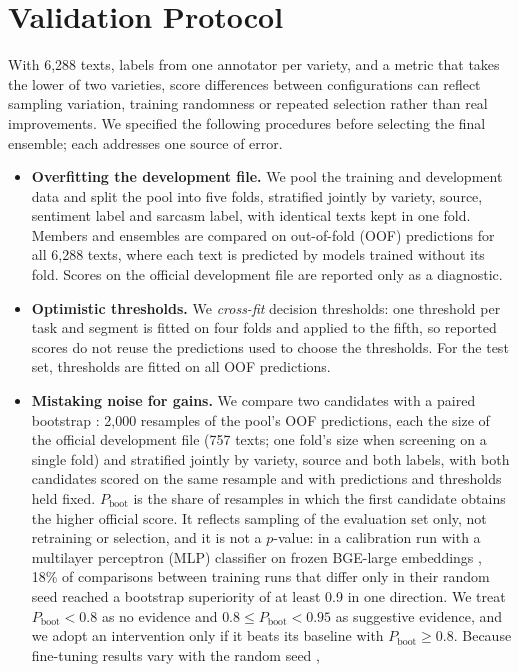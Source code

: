 \documentclass[11pt]{article}
\newcommand{\pboot}{P_{\mathrm{boot}}}
\begin{document}
\section{Validation Protocol}
\label{sec:protocol}
With 6,288 texts, labels from one annotator per variety, and a metric that takes the lower of two varieties, score
differences between configurations can reflect sampling variation, training randomness or repeated selection rather
than real improvements. We specified the following procedures before selecting the final ensemble; each addresses one
source of error.
\begin{itemize}
\item \textbf{Overfitting the development file.} We pool the training and development data and split the pool into five
folds, stratified jointly by variety, source, sentiment label and sarcasm label, with identical texts kept in one fold. Members and ensembles are compared
on out-of-fold (OOF) predictions for all 6,288 texts, where each text is predicted by models trained without its fold.
Scores on the official development file are reported only as a diagnostic.
\item \textbf{Optimistic thresholds.} We \emph{cross-fit} decision thresholds: one threshold per task and segment is
fitted on four folds and applied to the fifth, so reported scores do not reuse the predictions used to choose the
thresholds. For the test set, thresholds are fitted on all OOF predictions.
\item \textbf{Mistaking noise for gains.} We compare two candidates with a paired bootstrap \citep{efron1979bootstrap,
koehn-2004-statistical}: 2,000 resamples of the pool's OOF predictions, each the size of the official development file
(757 texts; one fold's size when screening on a single fold) and stratified jointly by variety, source and both labels,
with both candidates scored on the same resample and with predictions and thresholds held fixed. $\pboot$ is the share of
resamples in which the first candidate obtains the higher official score. It reflects sampling of the evaluation set only, not
retraining or selection, and it is not a $p$-value: in a calibration run with a multilayer perceptron (MLP) classifier on
frozen BGE-large embeddings \citep{xiao2023cpack}, 18\% of comparisons between training runs that differ only in their
random seed reached a bootstrap superiority of at least 0.9 in one direction. We treat
$\pboot<0.8$ as no evidence and $0.8\leq\pboot<0.95$ as suggestive evidence, and we adopt an intervention only if it beats
its baseline with $\pboot\geq0.8$. Because fine-tuning results vary with the random seed \citep{dodge2020finetuning},

\end{itemize}
\end{document}
